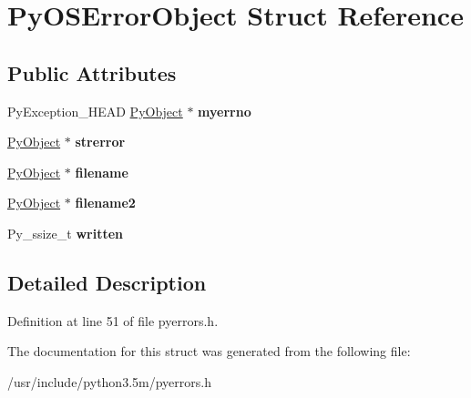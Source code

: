 \hypertarget{structPyOSErrorObject}{}\section{Py\+O\+S\+Error\+Object Struct Reference}
\label{structPyOSErrorObject}
\subsection*{Public Attributes}
\begin{DoxyCompactItemize}
\item 
Py\+Exception\+\_\+\+H\+E\+AD \hyperlink{struct__object}{Py\+Object} $\ast$ {\bfseries myerrno}\hypertarget{structPyOSErrorObject_a7eeb951070c417b3eb579833b3495f34}{}\label{structPyOSErrorObject_a7eeb951070c417b3eb579833b3495f34}

\item 
\hyperlink{struct__object}{Py\+Object} $\ast$ {\bfseries strerror}\hypertarget{structPyOSErrorObject_ac678d65d807c599fd0f2a541372006cc}{}\label{structPyOSErrorObject_ac678d65d807c599fd0f2a541372006cc}

\item 
\hyperlink{struct__object}{Py\+Object} $\ast$ {\bfseries filename}\hypertarget{structPyOSErrorObject_ab50f77f250da6f83be31d21b55d0ef1a}{}\label{structPyOSErrorObject_ab50f77f250da6f83be31d21b55d0ef1a}

\item 
\hyperlink{struct__object}{Py\+Object} $\ast$ {\bfseries filename2}\hypertarget{structPyOSErrorObject_a8cd567c34bd9165a42f138f65399e066}{}\label{structPyOSErrorObject_a8cd567c34bd9165a42f138f65399e066}

\item 
Py\+\_\+ssize\+\_\+t {\bfseries written}\hypertarget{structPyOSErrorObject_a4e9f1f9a6361d9c56b8b71364c020055}{}\label{structPyOSErrorObject_a4e9f1f9a6361d9c56b8b71364c020055}

\end{DoxyCompactItemize}


\subsection{Detailed Description}


Definition at line 51 of file pyerrors.\+h.



The documentation for this struct was generated from the following file\+:\begin{DoxyCompactItemize}
\item 
/usr/include/python3.\+5m/pyerrors.\+h\end{DoxyCompactItemize}

